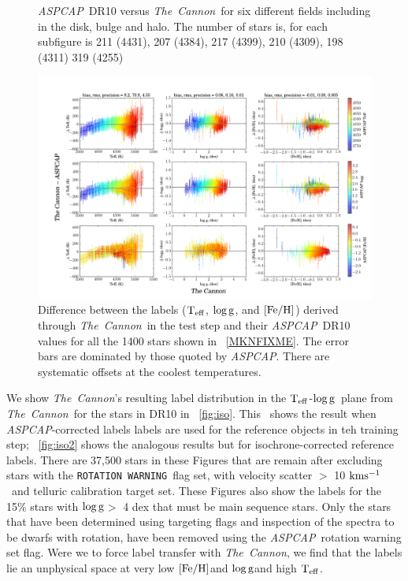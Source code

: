 \documentclass[12pt, preprint]{aastex}
\newcommand{\teff}{\mbox{$\rm T_{eff}$}}
\newcommand{\kms}{\mbox{$\rm kms^{-1}$}}
\newcommand{\feh}{\mbox{$\rm [Fe/H]$}}
\newcommand{\logg}{\mbox{$\rm \log g$}}
\newcommand{\tc}{\textsl{The~Cannon}}
\newcommand{\aspcap}{\textsl{ASPCAP}}
\newcommand{\rotwarn}{\texttt{ROTATION WARNING}}
\begin{document}
\begin{figure}[!h]
\caption{\small{\aspcap\ DR10 versus \tc\ for six different fields including in the disk, bulge and halo. The number of stars is, for each subfigure is 211 (4431), 207 (4384), 217 (4399), 210 (4309), 198 (4311) 319 (4255) }}
\label{fig:cal}
\end{figure}

\begin{figure}[!h]
\centering
        \includegraphics[scale=0.35]{./plots/cplot2.png} 
\caption{Difference between the labels (\teff, \logg, and \feh) derived through \tc\ in the test step and their \aspcap\ DR10 values for all the 1400 stars shown in \figurename~\ref{MKNFIXME}. The error bars are dominated by those quoted by \aspcap. There are systematic offsets at the coolest temperatures.}
\label{fig:cplot}
\end{figure}


We show \tc 's resulting label distribution in the \teff-\logg\ plane from \tc\ for the stars in DR10 in \figurename~\ref{fig:iso}. 
This \figurename\ shows the result when \aspcap -corrected labels labels are used for the reference objects in teh training step; \figurename~\ref{fig:iso2} shows the analogous results but for isochrone-corrected reference labels. There are 37,500 stars in these Figures that are remain after excluding stars with the \rotwarn\ flag set, with velocity scatter $>$ 10 \kms\ and telluric calibration target set. These Figures also show the labels for the 15\% stars with \logg $>$ 4 dex that must be main sequence stars.
 Only the stars that have been determined using targeting flags and inspection of the spectra to be dwarfs with rotation, 
 have been removed using the \aspcap\ rotation warning set flag. 
 Were we to force label transfer with \tc , we find that the labels lie an unphysical space at very low \feh and \logg and high \teff.
\end{document}

